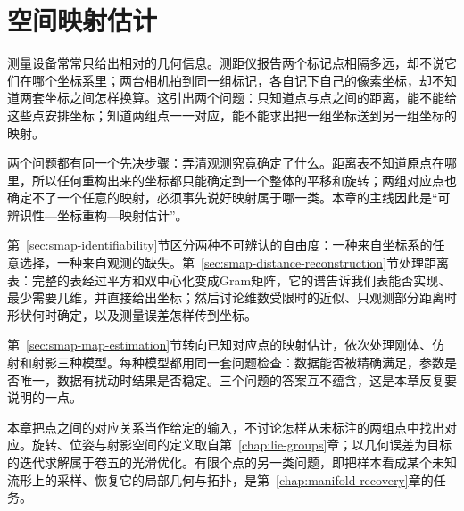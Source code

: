 \chapter{空间映射估计}
\label{chap:spatial-map-estimation}

测量设备常常只给出相对的几何信息。测距仪报告两个标记点相隔多远，却不说它们在哪个坐标系里；两台相机拍到同一组标记，各自记下自己的像素坐标，却不知道两套坐标之间怎样换算。这引出两个问题：只知道点与点之间的距离，能不能给这些点安排坐标；知道两组点一一对应，能不能求出把一组坐标送到另一组坐标的映射。

两个问题都有同一个先决步骤：弄清观测究竟确定了什么。距离表不知道原点在哪里，所以任何重构出来的坐标都只能确定到一个整体的平移和旋转；两组对应点也确定不了一个任意的映射，必须事先说好映射属于哪一类。本章的主线因此是“可辨识性—坐标重构—映射估计”。

第~\ref{sec:smap-identifiability}节区分两种不可辨认的自由度：一种来自坐标系的任意选择，一种来自观测的缺失。第~\ref{sec:smap-distance-reconstruction}节处理距离表：完整的表经过平方和双中心化变成Gram矩阵，它的谱告诉我们表能否实现、最少需要几维，并直接给出坐标；然后讨论维数受限时的近似、只观测部分距离时形状何时确定，以及测量误差怎样传到坐标。

第~\ref{sec:smap-map-estimation}节转向已知对应点的映射估计，依次处理刚体、仿射和射影三种模型。每种模型都用同一套问题检查：数据能否被精确满足，参数是否唯一，数据有扰动时结果是否稳定。三个问题的答案互不蕴含，这是本章反复要说明的一点。

本章把点之间的对应关系当作给定的输入，不讨论怎样从未标注的两组点中找出对应。旋转、位姿与射影空间的定义取自第~\ref{chap:lie-groups}章；以几何误差为目标的迭代求解属于卷五的光滑优化。有限个点的另一类问题，即把样本看成某个未知流形上的采样、恢复它的局部几何与拓扑，是第~\ref{chap:manifold-recovery}章的任务。





